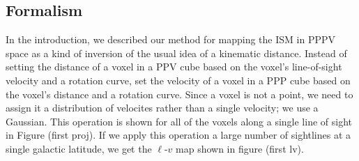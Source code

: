 



\subsection{Formalism}
\label{sec:KT-method}
In the introduction, we described our method for mapping the ISM in PPPV space as a kind of inversion of the usual idea of a kinematic distance. Instead of setting the distance of a voxel in a PPV cube based on the voxel's line-of-sight velocity and a rotation curve, set the velocity of a voxel in a PPP cube based on the voxel's distance and a rotation curve. Since a voxel is not a point, we need to assign it a distribution of velocites rather than a single velocity; we use a Gaussian. This operation is shown for all of the voxels along a single line of sight in Figure (first proj). If we apply this operation a large number of sightlines at a single galactic latitude, we get the $\ell$-$v$ map shown in figure (first lv). 

